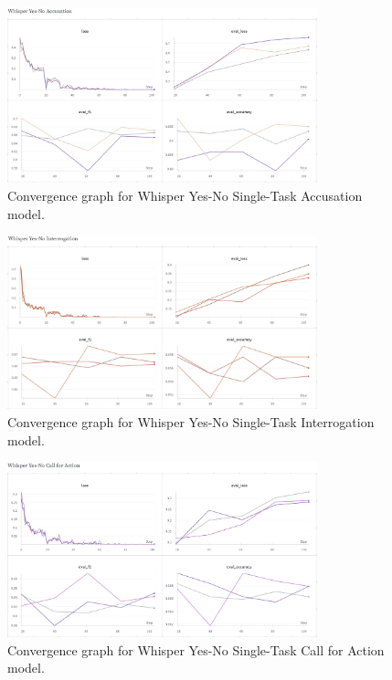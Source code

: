 \documentclass{article}
\begin{document}
\begin{figure}[H]
    \centering
    \includegraphics[width=0.8\textwidth]{convergence_graphs/whisper_yn_accusation.png}
    \caption{Convergence graph for Whisper Yes-No Single-Task Accusation model.}
    \label{fig:whisper_yn_accusation}
\end{figure}

\begin{figure}[H]
    \centering
    \includegraphics[width=0.8\textwidth]{convergence_graphs/whisper_yn_interrogation.png}
    \caption{Convergence graph for Whisper Yes-No Single-Task Interrogation model.}
    \label{fig:whisper_yn_interrogation}
\end{figure}

\begin{figure}[H]
    \centering
    \includegraphics[width=0.8\textwidth]{convergence_graphs/whisper_yn_call_for_action.png}
    \caption{Convergence graph for Whisper Yes-No Single-Task Call for Action model.}
    \label{fig:whisper_yn_call_for_action}
\end{figure}
\end{document}

